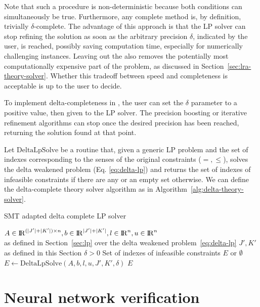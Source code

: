 \documentclass[runningheads]{llncs}
\begin{document}
Note that such a procedure is non-deterministic because both conditions can simultaneously be true.
Furthermore, any complete method is, by definition, trivially $\delta$-complete.
The advantage of this approach is that the LP solver can stop refining the solution as soon as the arbitrary precision $\delta$, indicated by the user, is reached, possibly saving computation time, especially for numerically challenging instances.
Leaving out the \nqcs also removes the potentially most computationally expensive part of the problem, as discussed in Section~\ref{sec:lra-theory-solver}.
Whether this tradeoff between speed and completeness is acceptable is up to the user to decide.

To implement delta-completeness in \dlinear, the user can set the $\delta$ parameter to a positive value, then given to the LP solver.
The precision boosting or iterative refinement algorithms can stop once the desired precision has been reached, returning the solution found at that point.

Let $\text{DeltaLpSolve}$ be a routine that, given a generic LP problem and the set of indexes corresponding to the senses of the original constraints ($=, \le$), solves the delta weakened problem (Eq. \eqref{eq:delta-lp}) and returns the set of indexes of infeasible constraints if there are any or an empty set otherwise.
We can define the delta-complete theory solver algorithm as in Algorithm~\ref{alg:delta-theory-solver}.

\begin{algorithm}
    \caption{SMT adapted delta complete LP solver}\label{alg:delta-theory-solver}
    \begin{algorithmic}
        \Require $A \in {\rm I\!R}^{(|J'| + |K'|) \times n}, b \in {\rm I\!R}^{|J'| + |K'|}, l \in {\rm I\!R}^n, u \in {\rm I\!R}^n$ \\
        \qquad as defined in Section~\ref{sec:lp} over the delta weakened problem~\eqref{eq:delta-lp}
        \Require $J', K'$ as defined in this Section
        \Require $\delta > 0$
        \Ensure Set of indexes of infeasible constraints $E$ or $\emptyset$
        \State $E \gets \text{DeltaLpSolve}(A, b, l, u, J', K', \delta)$ 
        \State \Return $E$
    \end{algorithmic}
\end{algorithm}


\section{Neural network verification}
\label{sec:nn-verification}
\end{document}
